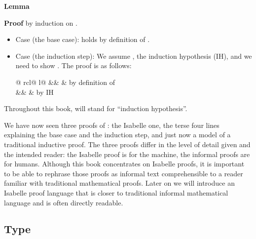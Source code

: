 \begin{isabellebody}
\begin{isamarkuptxt}
\noindent
\textbf{Lemma} 

\noindent
\textbf{Proof} by induction on .
\begin{itemize}
\item Case  (the base case): 
  holds by definition of .
\item Case  (the induction step):
  We assume , the induction hypothesis (IH),
  and we need to show .
  The proof is as follows:\smallskip

  \begin{tabular}{@ {}rcl@ {\quad}l@ {}}
   && 
  & by definition of \\
              &&  & by IH
  \end{tabular}
\end{itemize}
Throughout this book,  will stand for ``induction hypothesis''.

We have now seen three proofs of : the Isabelle one, the
terse four lines explaining the base case and the induction step, and just now a
model of a traditional inductive proof. The three proofs differ in the level
of detail given and the intended reader: the Isabelle proof is for the
machine, the informal proofs are for humans. Although this book concentrates
on Isabelle proofs, it is important to be able to rephrase those proofs
as informal text comprehensible to a reader familiar with traditional
mathematical proofs. Later on we will introduce an Isabelle proof language
that is closer to traditional informal mathematical language and is often
directly readable.

\subsection{Type }


\end{isamarkuptxt}
\end{isabellebody}
